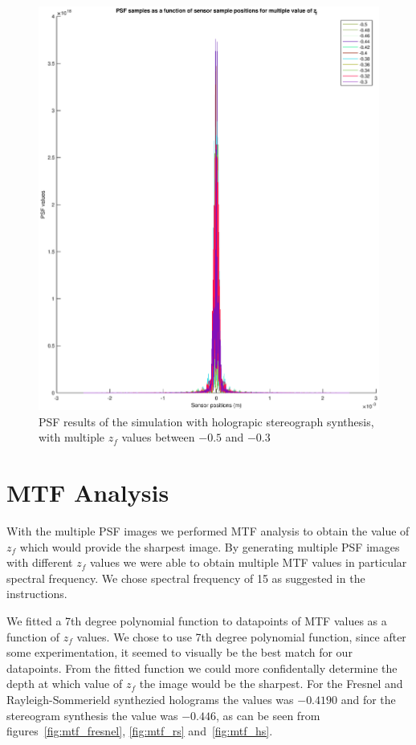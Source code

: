 \documentclass[12pt,a4paper,english
]{tunithesis}
\begin{document}
\begin{figure}
  \centering
  \includegraphics[width=\columnwidth]{img/psf_multiple_hs.eps}
  \caption{PSF results of the simulation with holograpic stereograph synthesis, with multiple $z_f$ values between $-0.5$ and $-0.3$}
  \label{fig:psf_multiple_hs}
\end{figure}

\section{MTF Analysis}
With the multiple PSF images we performed MTF analysis to obtain the value of $z_f$ which would provide the sharpest image. By generating multiple PSF images with different $z_f$ values we were able to obtain multiple MTF values in particular spectral frequency. We chose spectral frequency of 15 as suggested in the instructions.

We fitted a 7th degree polynomial function to datapoints of MTF values as a function of $z_f$ values. We chose to use 7th degree polynomial function, since after some experimentation, it seemed to visually be the best match for our datapoints. From the fitted function we could more confidentally determine the depth at which value of $z_f$ the image would be the sharpest. For the Fresnel and Rayleigh-Sommerield synthezied holograms the values was $-0.4190$ and for the stereogram synthesis the value was $-0.446$, as can be seen from figures~\ref{fig:mtf_fresnel}, \ref{fig:mtf_rs} and~\ref{fig:mtf_hs}.
\end{document}
